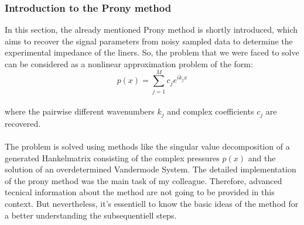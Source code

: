\documentclass{article}
\begin{document}
\subsubsection{Introduction to the Prony method}
In this section, the already mentioned Prony method is shortly introduced, which aims to recover the signal parameters from noisy sampled data to determine the experimental impedance of the liners. So, the problem that we were faced to solve can be considered as a nonlinear approximation problem of the form: \\
\begin{equation}\label{eqn: expsum}
 p(x)=\sum\limits_{j=1}^M c_{j}e^{ik_{j}x} 
\end{equation}
\\
where the pairwise different wavenumbers $k_{j}$ and complex coefficients $c_{j}$ are recovered. \\\\
The problem is solved using methods like the singular value decomposition of a generated Hankelmatrix consisting of the complex pressures $p(x)$ and the solution of an overdetermined Vandermode System. The detailed implementation of the prony method was the main task of my colleague. Therefore, advanced tecnical information about the method are not going to be provided in this context. But nevertheless, it's essentiell to know the basic ideas of the method for a better understanding the subsequentiell steps. 
\end{document}
